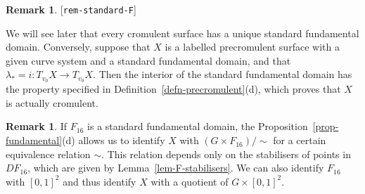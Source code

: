 \documentclass[reqno]{amsart}
\newcommand{\lbl}[1]{\label{#1}\textup{[\texttt{#1}]}\par}
\newcommand{\lbl}{\label}
\newcommand{\lm}        {\lambda}
\newcommand{\tm}        {\times}
\renewcommand{\:}{\colon}
\theoremstyle{definition}
\newtheorem{remark}[theorem]{Remark}
\begin{document}
\begin{remark}\lbl{rem-standard-F}
 We will see later that every cromulent surface has a unique standard
 fundamental domain.  Conversely, suppose that $X$ is a labelled
 precromulent surface with a given curve system and a standard
 fundamental domain, and that $\lm_*=i\:T_{v_0}X\to T_{v_0}X$.  Then
 the interior of the standard fundamental domain has the property
 specified in Definition~\ref{defn-precromulent}(d), which proves that
 $X$ is actually cromulent.
\end{remark}

\begin{remark}
 If $F_{16}$ is a standard fundamental domain, the
 Proposition~\ref{prop-fundamental}(d) allows us to identify $X$ with
 $(G\tm F_{16})/\sim$ for a certain equivalence relation $\sim$.  This
 relation depends only on the stabilisers of points in $DF_{16}$,
 which are given by Lemma~\ref{lem-F-stabilisers}.  We can also
 identify $F_{16}$ with $[0,1]^2$ and thus identify $X$ with a
 quotient of $G\tm [0,1]^2$.
\end{remark}
\end{document}
